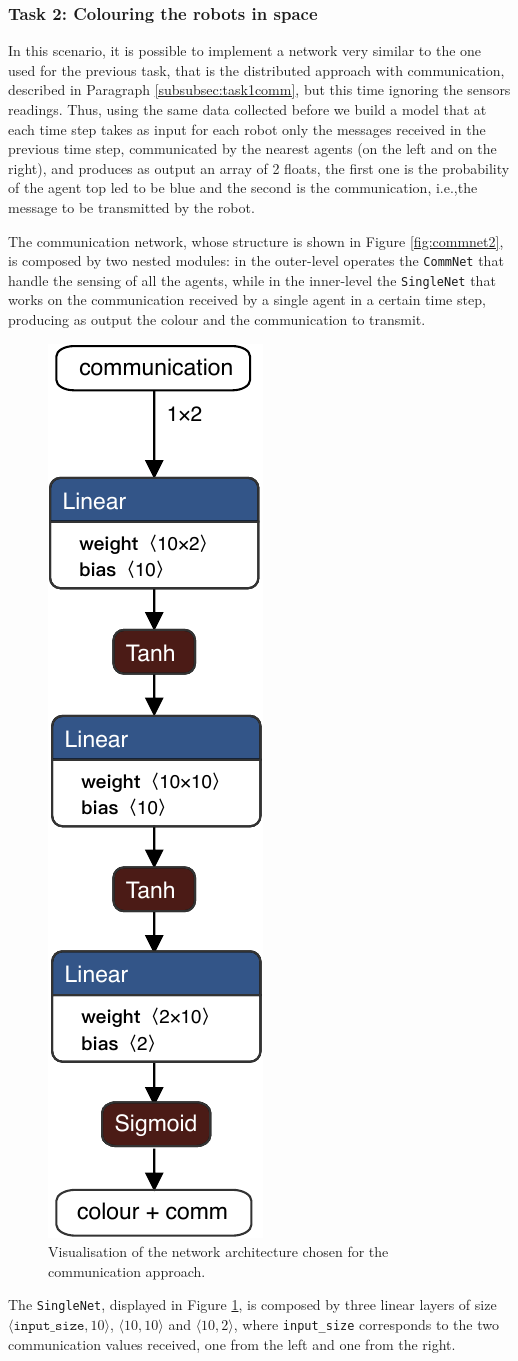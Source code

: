 \subsubsection{Task 2: Colouring the robots in space}
In this scenario, it is possible to implement a network very similar to the one used 
for the previous task, that is the distributed approach with communication, 
described in Paragraph \ref{subsubsec:task1comm}, but this time ignoring the 
sensors readings.
Thus, using the same data collected before we build a model that at each time 
step takes as input for each robot only the messages received in the previous time 
step, communicated by the nearest agents (on the left and on the right), and 
produces as output an array of 2 floats, the first one is the probability of the agent 
top \gls{led} to be blue and the second is the communication, i.e.,the message to 
be transmitted by the robot.

The communication network, whose structure is shown in Figure 
\ref{fig:commnet2}, is composed by two nested modules: in the outer-level 
operates the \texttt{CommNet} that handle the sensing of all the agents, while in 
the inner-level the \texttt{SingleNet} that works on the communication received 
by a single agent in a certain time step, producing as output the colour and the 
communication to transmit. 
\begin{figure}[H]
	\centering
	\includegraphics[width=.14\textwidth]{contents/images/task2allcomm}
	\caption[Network architectures for the communication approach.]{Visualisation 
		of the network architecture chosen for the 
		communication approach.}
	\label{fig:singlenetcomm2}
\end{figure}

The \texttt{SingleNet}, displayed in Figure \ref{fig:singlenetcomm2}, is composed 
by three linear layers of size $\langle \mathtt{input\_size}, 10\rangle$,  $\langle 
10, 10\rangle$ and $\langle 10, 2\rangle$, where \texttt{input\_size} 
corresponds to the two communication values received, one from the left and one 
from the right.

